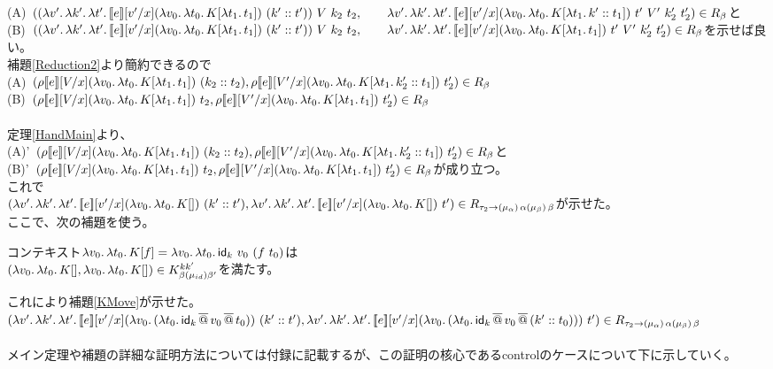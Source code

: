 (A)\ $(\LamP{v'}{\Lam{k'}{\Lam{t'}{\CPSTh{e}[\Change{x}{v'}] \LamP{v_0}{\Lam{t_0}{K[\Lam{t_1}{t_1}]}}\ \ConsP{k'}{t'}}}}\ V\ k_2\ t_2,\\
\qquad \Lam{v'}{\Lam{k'}{\Lam{t'}{\CPSTh{e}[\Change{x}{v'}] \LamP{v_0}{\Lam{t_0}{K[\Lam{t_1}{\Cons{k'}{t_1}}]}}\ t'}}}\ V'\ k_2'\ t_2')\in R_{\beta}$と\\
(B)\ $(\LamP{v'}{\Lam{k'}{\Lam{t'}{\CPSTh{e}[\Change{x}{v'}] \LamP{v_0}{\Lam{t_0}{K[\Lam{t_1}{t_1}]}}\ \ConsP{k'}{t'}}}}\ V\ k_2\ t_2,\\
\qquad \Lam{v'}{\Lam{k'}{\Lam{t'}{\CPSTh{e}[\Change{x}{v'}] \LamP{v_0}{\Lam{t_0}{K[\Lam{t_1}{t_1}]}}\ t'}}}\ V'\ k_2'\ t_2')\in R_{\beta}$を示せば良い。\\
補題\ref{Reduction2}より簡約できるので\\
(A)\ $(\rho \CPSTh{e}[\Change{x}{V}] \LamP{v_0}{\Lam{t_0}{K[\Lam{t_1}{t_1}]}}\ \ConsP{k_2}{t_2},
 \rho \CPSTh{e}[\Change{x}{V'}] \LamP{v_0}{\Lam{t_0}{K[\Lam{t_1}{\Cons{k_2'}{t_1}}]}}\ t_2')\in R_{\beta}$\\
(B)\ $(\rho \CPSTh{e}[\Change{x}{V}] \LamP{v_0}{\Lam{t_0}{K[\Lam{t_1}{t_1}]}}\ t_2,
 \rho \CPSTh{e}[\Change{x}{V'}] \LamP{v_0}{\Lam{t_0}{K[\Lam{t_1}{t_1}]}}\ t_2')\in R_{\beta}$\\
\\
定理\ref{HandMain}より、\\
(A)'\ $(\rho \CPSTh{e}[\Change{x}{V}] \LamP{v_0}{\Lam{t_0}{K[\Lam{t_1}{t_1}]}}\ \ConsP{k_2}{t_2}, \rho \CPSTh{e}[\Change{x}{V'}] \LamP{v_0}{\Lam{t_0}{K[\Lam{t_1}{\Cons{k_2'}{t_1}}]}}\ t_2')\in R_{\beta}$と\\
(B)'\  $(\rho \CPSTh{e}[\Change{x}{V}] \LamP{v_0}{\Lam{t_0}{K[\Lam{t_1}{t_1}]}}\ t_2, \rho \CPSTh{e}[\Change{x}{V'}] \LamP{v_0}{\Lam{t_0}{K[\Lam{t_1}{t_1}]}}\ t_2')\in R_{\beta}$が成り立つ。\\
これで\\
$(\Lam{v'}{\Lam{k'}{\Lam{t'}{\CPSTh{e}[\Change{x}{v'}] \LamP{v_0}{\Lam{t_0}{K[]}}\ \ConsP{k'}{t'}}}},\\
\Lam{v'}{\Lam{k'}{\Lam{t'}{\CPSTh{e}[\Change{x}{v'}] \LamP{v_0}{\Lam{t_0}{K[]}}\ t'}}})
\in R_{\tau_2 \rightarrow \TrailType{\alpha} \TrailType{\beta}}$が示せた。
\\
ここで、次の補題を使う。
\begin{lemma}
  コンテキスト$\Lam{v_0}{\Lam{t_0}{K[f]}}=\Lam{v_0}{\Lam{t_0}{\Idk\ v_0\ (f\ t_0)}}$は\\
  $(\Lam{v_0}{\Lam{t_0}{K[]}}, \Lam{v_0}{\Lam{t_0}{K[]}})\in  K^{kk'}_{\beta(\mu_{id})\beta'}$を満たす。
\label{IdkContext}
\end{lemma}
これにより補題\ref{KMove}が示せた。\\
$(\Lam{v'}{\Lam{k'}{\Lam{t'}{\CPSTh{e}[\Change{x}{v'}] \LamP{v_0}{\LamP{t_0}{\SApp{\Idk}{\SApp{v_0}{t_0}}}}\ \ConsP{k'}{t'}}}},\\
\Lam{v'}{\Lam{k'}{\Lam{t'}{\CPSTh{e}[\Change{x}{v'}] \LamP{v_0}{\LamP{t_0}{\SApp{\Idk}{\SApp{v_0}{\ConsP{k'}{t_0}}}}}\ t'}}})
\in R_{\tau_2 \rightarrow \TrailType{\alpha} \TrailType{\beta}}$\\
\\
メイン定理や補題の詳細な証明方法については付録に記載するが、この証明の核心であるcontrolのケースについて下に示していく。
